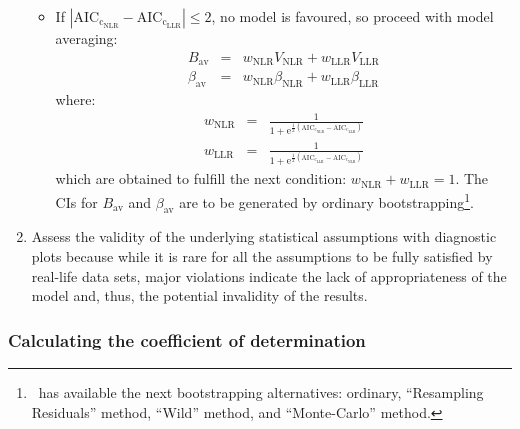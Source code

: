\begin{enumerate}
\begin{itemize}
        \item If $\left|\mathrm{AIC_{c_{NLR}}} - \mathrm{AIC_{c_{LLR}}}\right| \leq 2$, no model is favoured, so proceed with model averaging:
        \begin{eqnarray*}
            B_\text{av} &=& w_\text{NLR}V_\text{NLR} + w_\text{LLR}V_\text{LLR} \\
            \beta_\text{av} &=& w_\text{NLR}\beta_\text{NLR} + w_\text{LLR}\beta_\text{LLR}
        \end{eqnarray*}
        where: 
        \begin{eqnarray*}
            w_\text{NLR} &=& \frac{1}{1+\mathrm{e}^{\frac{1}{2}\left(\mathrm{AIC_{c_{NLR}}}-\mathrm{AIC_{c_{LLR}}}\right)}} \\
            w_\text{LLR} &=& \frac{1}{1+\mathrm{e}^{\frac{1}{2}\left(\mathrm{AIC_{c_{LLR}}}-\mathrm{AIC_{c_{NLR}}}\right)}}
        \end{eqnarray*}
        which are obtained to fulfill the next condition: $w_\text{NLR} + w_\text{LLR} = 1$. The CIs for $B_\text{av}$ and $\beta_\text{av}$ are to be generated by ordinary bootstrapping\footnote{\CC\ has available the next bootstrapping alternatives\cite{boot}: ordinary, ``Resampling Residuals'' method, ``Wild'' method, and ``Monte-Carlo'' method.}.      
    \end{itemize}
    \item Assess the validity of the underlying statistical assumptions with diagnostic plots because while it is rare for all the assumptions to be fully satisfied by real-life data sets, major violations indicate the lack of appropriateness of the model and, thus, the potential invalidity of the results.
\end{enumerate}

\subsubsection*{Calculating the coefficient of determination}

